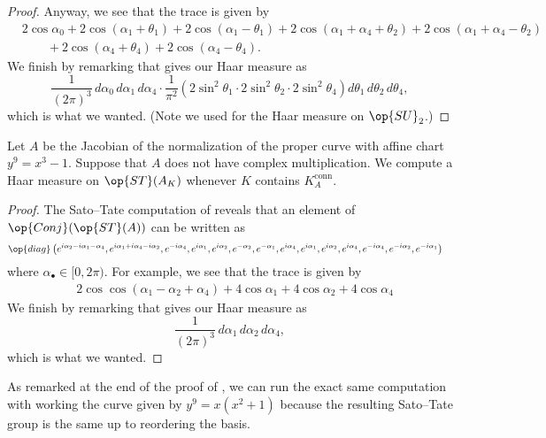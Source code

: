 \documentclass[../thesis.tex]{subfiles}
\begin{document}
\begin{proof}
	Anyway, we see that the trace is given by
	\begin{align*}
		&2\cos\alpha_0+2\cos(\alpha_1+\theta_1)+2\cos(\alpha_1-\theta_1)+2\cos(\alpha_1+\alpha_4+\theta_2)+2\cos(\alpha_1+\alpha_4-\theta_2) \\
		&\qquad+2\cos(\alpha_4+\theta_4)+2\cos(\alpha_4-\theta_4).
	\end{align*}
	We finish by remarking that  gives our Haar measure as
	\[\frac1{(2\pi)^3}\,d\alpha_0\,d\alpha_1\,d\alpha_4\cdot\frac1{\pi^2}\left(2\sin^2\theta_1\cdot2\sin^2\theta_2\cdot2\sin^2\theta_4\right)d\theta_1\,d\theta_2\,d\theta_4,\]
	which is what we wanted. (Note we used  for the Haar measure on $\op{SU}_2$.)
\end{proof}
\begin{proposition} \label{prop:special-fermat-st-measure-1}
	Let $A$ be the Jacobian of the normalization of the proper curve with affine chart $y^9=x^3-1$. Suppose that $A$ does not have complex multiplication. We compute a Haar measure on $\op{ST}(A_K)$ whenever $K$ contains $K_A^{\mathrm{conn}}$.
\end{proposition}
\begin{proof}
	The Sato--Tate computation of  reveals that an element of $\op{Conj}(\op{ST}(A))$ can be written as
	\begin{align*}
		&\op{diag}\left(e^{i\alpha_2-i\alpha_1-\alpha_4},e^{i\alpha_1+i\alpha_4-i\alpha_2},e^{-i\alpha_4},e^{i\alpha_1},e^{i\alpha_2},e^{-\alpha_2},e^{-\alpha_1},e^{i\alpha_4},e^{i\alpha_1},e^{i\alpha_2},e^{i\alpha_4},e^{-i\alpha_4},e^{-i\alpha_2},e^{-i\alpha_1}\right)
	\end{align*}
	where $\alpha_\bullet\in[0,2\pi)$. For example, we see that the trace is given by
	\begin{align*}
		&2\cos\cos(\alpha_1-\alpha_2+\alpha_4)+4\cos\alpha_1+4\cos\alpha_2+4\cos\alpha_4
	\end{align*}
	We finish by remarking that  gives our Haar measure as
	\[\frac1{(2\pi)^3}\,d\alpha_1\,d\alpha_2\,d\alpha_4,\]
	which is what we wanted.
\end{proof}
\begin{remark}
	As remarked at the end of the proof of , we can run the exact same computation with working the curve given by $y^9=x\left(x^2+1\right)$ because the resulting Sato--Tate group is the same up to reordering the basis.
\end{remark}
\end{document}
